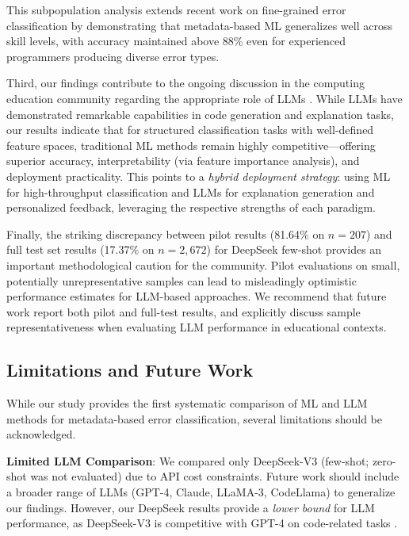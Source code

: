 \documentclass[10pt,letterpaper]{article}
\begin{document}
This subpopulation analysis extends recent work on fine-grained error
classification \cite{altadmri2015most} by demonstrating that
metadata-based ML generalizes well across skill levels, with accuracy
maintained above 88\% even for experienced programmers producing diverse
error types.

Third, our findings contribute to the ongoing discussion in the computing
education community regarding the appropriate role of LLMs
\cite{finnie2022robots,kazemitabaar2024impact}. While LLMs have
demonstrated remarkable capabilities in code generation and explanation tasks,
our results indicate that for structured classification tasks with
well-defined feature spaces, traditional ML methods remain highly
competitive---offering superior accuracy, interpretability (via feature
importance analysis), and deployment practicality. This points to a
\textit{hybrid deployment strategy}: using ML for high-throughput
classification and LLMs for explanation generation and personalized
feedback, leveraging the respective strengths of each paradigm.

Finally, the striking discrepancy between pilot results (81.64\% on \(n=207\))
and full test set results (17.37\% on \(n=2,672\)) for DeepSeek few-shot
provides an important methodological caution for the community.
Pilot evaluations on small, potentially unrepresentative samples can
lead to misleadingly optimistic performance estimates for LLM-based
approaches. We recommend that future work report both pilot and full-test
results, and explicitly discuss sample representativeness when evaluating
LLM performance in educational contexts.


\subsection{Limitations and Future Work}

While our study provides the first systematic comparison of ML and LLM methods
for metadata-based error classification, several limitations should be acknowledged.

\textbf{Limited LLM Comparison}: We compared only DeepSeek-V3 (few-shot; zero-shot was not evaluated) due to API cost constraints. Future work should include a broader
range of LLMs (GPT-4, Claude, LLaMA-3, CodeLlama) to generalize our
findings. However, our DeepSeek results provide a \textit{lower bound} for
LLM performance, as DeepSeek-V3 is competitive with GPT-4 on code-related tasks
\cite{deepseek2024technical}.
\end{document}

